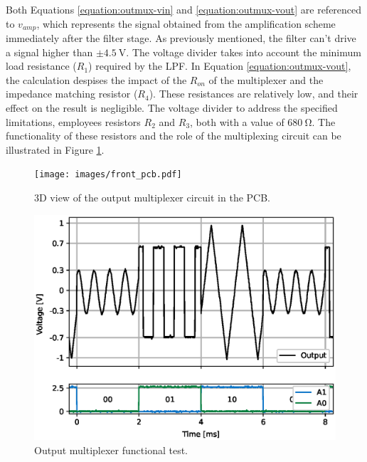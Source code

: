 \noindent
Both Equations \ref{equation:outmux-vin} and \ref{equation:outmux-vout} are referenced to $v_{amp}$, which represents the signal obtained from the amplification scheme immediately after the filter stage. As previously mentioned, the filter can't drive a signal higher than $\mathrm{\pm 4.5~V}$. The voltage divider takes into account the minimum load resistance ($R_1$) required by the \ac{LPF}. In Equation \ref{equation:outmux-vout}, the calculation despises the impact of the $R_{on}$ of the multiplexer and the impedance matching resistor ($R_4$). These resistances are relatively low, and their effect on the result is negligible. The voltage divider to address the specified limitations, employees resistors $R_2$ and $R_3$, both with a value of $\mathrm{680~\Omega}$. The functionality of these resistors and the role of the multiplexing circuit can be illustrated in Figure \ref{figure:outmux-func}.


\begin{figure}[!ht]
    \centering
    \begin{minipage}{0.45\textwidth}
        \centering
        \texttt{[image: images/front\_pcb.pdf]}
        \caption{3D view of the output multiplexer circuit in the PCB.}
        \label{figure:outmux-pcb}
    \end{minipage}\hfill
    \begin{minipage}{0.45\textwidth}
        \centering
        \includegraphics[width=\textwidth]{images/chapter_4/communications/outmux_ex.eps}
        \caption{Output multiplexer functional test.}
        \label{figure:outmux-func}
    \end{minipage}
\end{figure}

